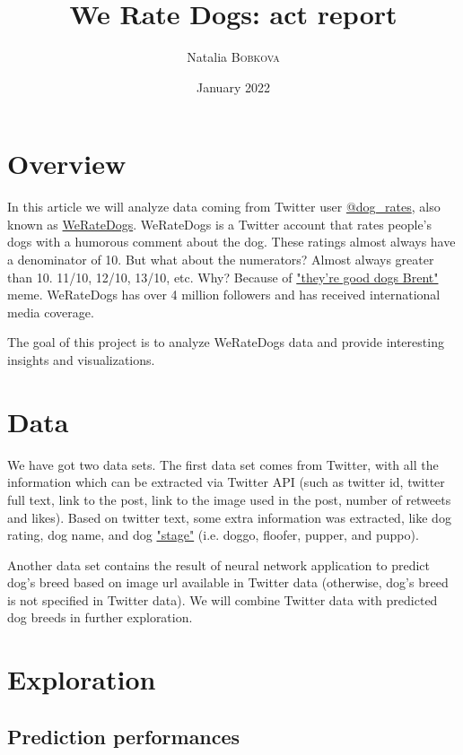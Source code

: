 \documentclass{article}
\title{We Rate Dogs: act report}
\author{Natalia \textsc{Bobkova}}
\date{January 2022}
\begin{document}
\maketitle

\section{Overview}

In this article we will analyze data coming from Twitter user \href{https://twitter.com/dog_rates}{@dog\_rates}, also known as \href{https://en.wikipedia.org/wiki/WeRateDogs}{WeRateDogs}. WeRateDogs is a Twitter account that rates people's dogs with a humorous comment about the dog. These ratings almost always have a denominator of 10. But what about the numerators? Almost always greater than 10. 11/10, 12/10, 13/10, etc. Why? Because of \href{http://knowyourmeme.com/memes/theyre-good-dogs-brent}{"they're good dogs Brent"} meme. WeRateDogs has over 4 million followers and has received international media coverage.

The goal of this project is to analyze WeRateDogs data and provide interesting insights and visualizations. 

\section{Data}

We have got two data sets. The first data set comes from Twitter, with all the information which can be extracted via Twitter API (such as twitter id, twitter full text, link to the post, link to the image used in the post, number of retweets and likes). Based on twitter text, some extra information was extracted, like dog rating, dog name, and dog \href{https://video.udacity-data.com/topher/2017/October/59e04ceb_dogtionary-combined/dogtionary-combined.png}{"stage"} (i.e. doggo, floofer, pupper, and puppo). 

Another data set contains the result of neural network application to predict dog's breed based on image url available in Twitter data (otherwise, dog's breed is not specified in Twitter data). We will combine Twitter data with predicted dog breeds in further exploration.

\section{Exploration}

\subsection{Prediction performances}
\end{document}
